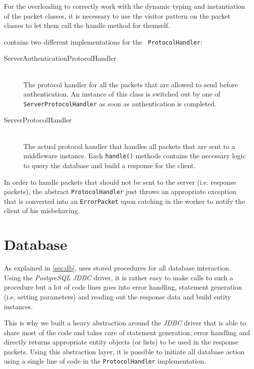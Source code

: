 \documentclass[a4paper, oneside]{csthesis}
\begin{document}
    For the overloading to correctly work with the dynamic typing and
    instantiation of the packet classes, it is necessary to use the visitor
    pattern on the packet classes to let them call the handle method for
    themself.
    
    \telesto contains two different implementations for the {\tt
    ProtocolHandler}:
    \begin{description}
    \item[ServerAuthenticationProtocolHandler] \ \\
        The protocol handler for all the packets that are allowed to send before
        authentication. An instance of this class is switched out by one of
        {\tt ServerProtocolHandler} as soon as authentication is completed.
    \item[ServerProtocolHandler] \ \\
        The actual protocol handler that handles all packets that are sent to a
        middleware instance. Each {\tt handle()} methods contains the necessary
        logic to query the database and build a response for the client.
    \end{description} 

    In order to handle packets that should not be sent to the server (i.e.
    response packets), the abstract {\tt ProtocolHandler} just throws an
    appropriate exception that is converted into an {\tt ErrorPacket} upon
    catching in the worker to notify the client of his misbehaving.

\section{Database}
    As explained in \cref{sec:db}, \telesto{} uses stored procedures for all
    database interaction. Using the {\it PostgreSQL JDBC} driver, it is rather
    easy to make calls to such a procedure but a lot of code lines goes into
    error handling, statement generation (i.e. setting parameters) and reading
    out the response data and build entity instances.
    
    This is why we built a heavy abstraction around the {\it JDBC} driver that
    is able to share most of the code and takes care of statement generation,
    error handling and directly returns appropriate entity objects (or lists) to
    be used in the response packets. Using this abstraction layer, it is
    possible to initiate all database action using a single line of code in the
    {\tt ProtocolHandler} implementation.
    
\end{document}
